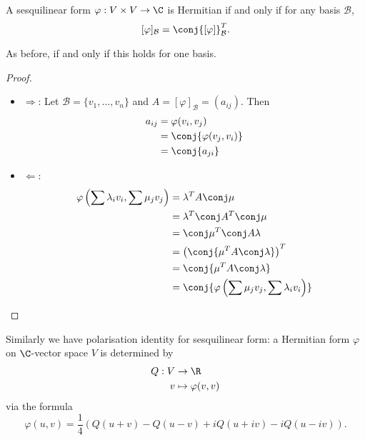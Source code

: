 \documentclass[a4paper]{article}
\newcommand*{\basis}{\mathcal}
\theoremstyle{definition}
\begin{document}
\begin{lemma}
  A sesquilinear form \(\varphi: V \times V \to \C\) is Hermitian if and only if for any basis \(\basis B\),
  \[
    [\varphi]_{\basis B} = \conj{[\varphi]}^T_{\basis B}.
  \]
\end{lemma}

As before, if and only if this holds for one basis.

\begin{proof}
  \begin{itemize}\leavevmode
  \item \(\Rightarrow\): Let \(\basis B = \{v_1, \dots, v_n\}\) and \(A = [\varphi]_{\basis B} = (a_{ij})\). Then
    \begin{align*}
      a_{ij} &= \varphi(v_i, v_j) \\
             &= \conj{\varphi(v_j, v_i)} \\
      &= \conj{a_{ji}}
    \end{align*}
  \item \(\Leftarrow\):
    \begin{align*}
      \varphi \left( \sum \lambda_iv_i, \sum \mu_jv_j \right) &= \lambda^T A \conj \mu \\
                                                              &= \lambda^T \conj A^T \conj \mu \\
                                                              &= \conj \mu^T \conj A \lambda \\
                                                              &= \left( \conj{\mu^T A \conj \lambda} \right)^T \\
                                                              &= \conj{\mu^T A \conj \lambda} \\
                                                              &= \conj{\varphi \left( \sum \mu_jv_j, \sum \lambda_iv_i \right)}
    \end{align*}
  \end{itemize}
\end{proof}

Similarly we have polarisation identity for sesquilinear form: a Hermitian form \(\varphi\) on \(\C\)-vector space \(V\) is determined by
\begin{align*}
  Q: V &\to \R \\
  v &\mapsto \varphi(v, v)
\end{align*}
via the formula
\[
  \varphi(u, v) = \frac{1}{4} \left( Q(u + v) - Q(u - v) + i Q(u + iv) - i Q(u - iv) \right).
\]
\end{document}
